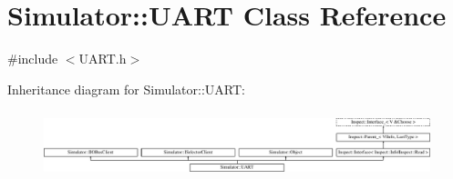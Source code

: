 \hypertarget{class_simulator_1_1_u_a_r_t}{\section{Simulator\+:\+:U\+A\+R\+T Class Reference}
\label{class_simulator_1_1_u_a_r_t}
}


{\ttfamily \#include $<$U\+A\+R\+T.\+h$>$}

Inheritance diagram for Simulator\+:\+:U\+A\+R\+T\+:\begin{figure}[H]
\begin{center}
\leavevmode
\includegraphics[height=1.964912cm]{class_simulator_1_1_u_a_r_t}
\end{center}
\end{figure}
